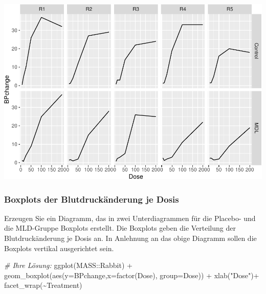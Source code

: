 \documentclass[
]{article}
\newenvironment{Shaded}{\begin{snugshade}}{\end{snugshade}}
\newcommand{\AttributeTok}[1]{\textcolor[rgb]{0.77,0.63,0.00}{#1}}
\newcommand{\CommentTok}[1]{\textcolor[rgb]{0.56,0.35,0.01}{\textit{#1}}}
\newcommand{\FunctionTok}[1]{\textcolor[rgb]{0.00,0.00,0.00}{#1}}
\newcommand{\NormalTok}[1]{#1}
\newcommand{\SpecialCharTok}[1]{\textcolor[rgb]{0.00,0.00,0.00}{#1}}
\newcommand{\StringTok}[1]{\textcolor[rgb]{0.31,0.60,0.02}{#1}}
\begin{document}
\includegraphics{Testat_1_Complete_files/figure-latex/unnamed-chunk-12-1.pdf}

\hypertarget{boxplots-der-blutdruckuxe4nderung-je-dosis}{%
\subsubsection{Boxplots der Blutdruckänderung je
Dosis}\label{boxplots-der-blutdruckuxe4nderung-je-dosis}}

Erzeugen Sie ein Diagramm, das in zwei Unterdiagrammen für die Placebo-
und die MLD-Gruppe Boxplots erstellt. Die Boxplots geben die Verteilung
der Blutdruckänderung je Dosis an. In Anlehnung an das obige Diagramm
sollen die Boxplots vertikal ausgerichtet sein.

\begin{Shaded}
\begin{Highlighting}[]
\CommentTok{\# Ihre Lösung:}
\FunctionTok{ggplot}\NormalTok{(MASS}\SpecialCharTok{::}\NormalTok{Rabbit) }\SpecialCharTok{+} \FunctionTok{geom\_boxplot}\NormalTok{(}\FunctionTok{aes}\NormalTok{(}\AttributeTok{y=}\NormalTok{BPchange,}\AttributeTok{x=}\FunctionTok{factor}\NormalTok{(Dose), }\AttributeTok{group=}\NormalTok{Dose)) }\SpecialCharTok{+}
  \FunctionTok{xlab}\NormalTok{(}\StringTok{"Dose"}\NormalTok{)}\SpecialCharTok{+}
  \FunctionTok{facet\_wrap}\NormalTok{(}\SpecialCharTok{\textasciitilde{}}\NormalTok{Treatment)}
\end{Highlighting}
\end{Shaded}
\end{document}
